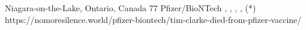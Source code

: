           {Niagara-on-the-Lake, Ontario, Canada}
          {77}
          {Pfizer/BioNTech}
          {}
          {
            ,
            ,
            ,
            ,
             (*)
          }
          {https://nomoresilence.world/pfizer-biontech/tim-clarke-died-from-pfizer-vaccine/}

